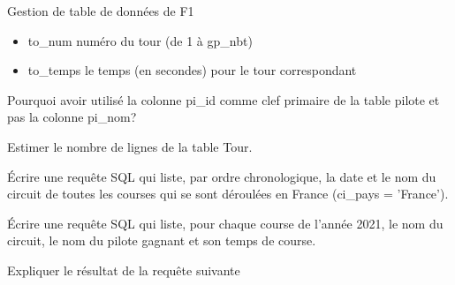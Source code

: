 \begin{exo}[PC][1][colle]{Gestion de table de données de F1}
\begin{itemize}
\begin{itemize}
                \item to\_num numéro du tour (de 1 à gp\_nbt)
                
                \item to\_temps le temps (en secondes) pour le tour correspondant
            \end{itemize}
                
            \end{itemize}

            \begin{quest}
                \item Pourquoi avoir utilisé la colonne pi\_id comme clef primaire de la table pilote et pas la colonne pi\_nom?
                
                \item Estimer le nombre de lignes de la table Tour.
                
                \item Écrire une requête SQL qui liste, par ordre chronologique, la date et le nom du circuit de toutes les courses qui se sont déroulées en France (ci\_pays = 'France').
                
                \item Écrire une requête SQL qui liste, pour chaque course de l'année 2021, le nom du circuit, le nom du pilote gagnant et son temps de course.
                
                \item Expliquer le résultat de la requête suivante
                
            \end{quest}



\end{exo}
